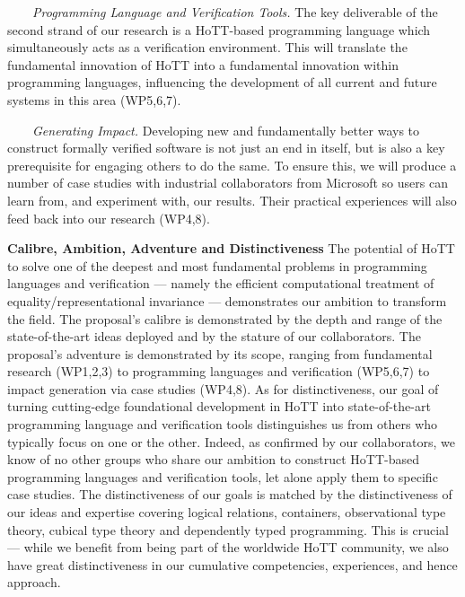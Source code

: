 \documentclass[a4paper,11pt]{article}
\begin{document}
$\;\;\;\;\;\;$ {\em Programming Language and Verification Tools.} The key
  deliverable of the second strand of our research is a HoTT-based
  programming language which simultaneously acts as a verification
  environment. This will translate the fundamental innovation of HoTT
  into a fundamental innovation within programming languages,
  influencing the development of all current and future systems in
  this area (WP5,6,7).

  $\;\;\;\;\;\;$ {\em Generating Impact.} Developing new and
  fundamentally better ways to construct formally verified software is
  not just an end in itself, but is also a key prerequisite for
  engaging others to do the same.  To ensure this, we will produce a
  number of case studies with industrial collaborators from Microsoft so users can
  learn from, and experiment with, our results. Their practical
  experiences will also feed back into our research (WP4,8).

  {\bf Calibre, Ambition, Adventure and Distinctiveness} The potential
  of HoTT to solve one of the deepest and most fundamental problems in
  programming languages and verification --- namely the efficient
  computational treatment of equality/representational invariance ---
  demonstrates our ambition to transform the field. The proposal's
  calibre is demonstrated by the depth and range of the
  state-of-the-art ideas deployed and by the stature of our
  collaborators. The proposal's adventure is demonstrated by its
  scope, ranging from fundamental research (WP1,2,3) to programming
  languages and verification (WP5,6,7) to impact generation via case
  studies (WP4,8). As for distinctiveness, our goal of turning
  cutting-edge foundational development in HoTT into
  state-of-the-art programming language and verification tools
  distinguishes us from others who typically focus on one or the
  other. Indeed, as confirmed by our collaborators, we know of no
  other groups who share our ambition to construct HoTT-based
  programming languages and verification tools, let alone apply them
  to specific case studies. The distinctiveness of our goals is
  matched by the distinctiveness of our ideas and expertise covering
  logical relations, containers, observational type theory, cubical
  type theory and dependently typed programming. This is crucial ---
  while we benefit from being part of the worldwide HoTT community, we
  also have great distinctiveness in our cumulative competencies,
  experiences, and hence approach.

\vspace*{-0.1in} 
\end{document}
